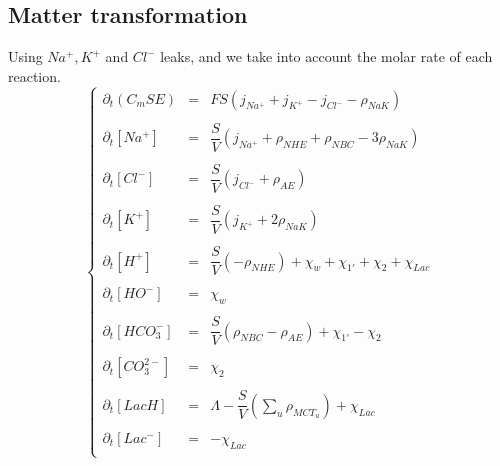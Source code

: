 \documentclass{revtex4}
\begin{document}
\subsection{Matter transformation}
Using $Na^+,K^+$ and $Cl^-$ leaks, and we take into account the molar rate of each reaction.	
\begin{equation}
\left\lbrace
\begin{array}{rcl}
	\partial_t \left(C_m S E \right) & = & FS\left(j_{Na^+}+j_{K^+}-j_{Cl^-} - \rho_{NaK}\right) \\
	\\
	\partial_t \left[Na^+\right] & = & \dfrac{S}{V}\left(j_{Na^+}+\rho_{NHE}+\rho_{NBC}-3\rho_{NaK}\right) \\
	\\
	\partial_t \left[Cl^-\right] & = & \dfrac{S}{V}\left(j_{Cl^-} + \rho_{AE}\right)\\
	\\
	\partial_t \left[K^+\right]  & = & \dfrac{S}{V}\left(j_{K^+}+2\rho_{NaK}\right)\\
	\\
	\partial_t \left[H^+\right]  & = & \dfrac{S}{V}\left(-\rho_{NHE}\right) + \chi_{w} + \chi_{1'} + \chi_2 + \chi_{Lac}\\
	\\
	\partial_t \left[HO^-\right] & = & \chi_{w}\\
	\\
	\partial_t \left[HCO_3^-\right] & = & \dfrac{S}{V}\left(\rho_{NBC}-\rho_{AE}\right) + \chi_{1'} - \chi_2 \\
	\\
	\partial_t \left[CO_3^{2-}\right] & = & \chi_2\\
	\\
	\partial_t \left[LacH\right]      & = & \Lambda - \dfrac{S}{V}\left(\sum_u\rho_{MCT_u}\right) + \chi_{Lac}\\
	\\
	\partial_t \left[Lac^-\right]     & = & - \chi_{Lac}\\
	
\end{array}
\right.
\end{equation}
\end{document}
